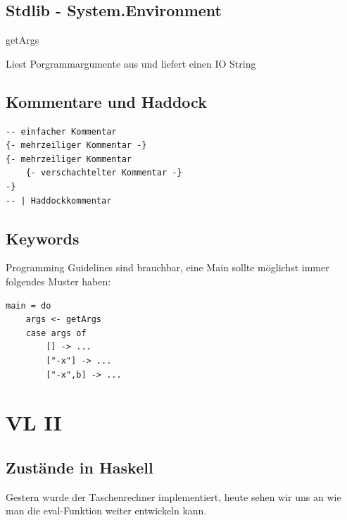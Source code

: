 \documentclass[ngerman,a4paper]{report}
\begin{document}
\section{Stdlib - System.Environment}
\begin{compactitem}
	\item getArgs
	\begin{compactitem}
		\item Liest Porgrammargumente aus und liefert einen IO String
	\end{compactitem}
\end{compactitem}

\section{Kommentare und Haddock}
\begin{lstlisting}
-- einfacher Kommentar
{- mehrzeiliger Kommentar -}
{- mehrzeiliger Kommentar 
	{- verschachtelter Kommentar -} 
-}
-- | Haddockkommentar
\end{lstlisting}

\section{Keywords}
Programming Guidelines sind brauchbar, eine Main sollte möglichst immer folgendes Muster haben:
\begin{lstlisting}
main = do 
	args <- getArgs
	case args of
		[] -> ...
		["-x"] -> ...
		["-x",b] -> ...
\end{lstlisting}

\chapter{VL II}
\section{Zustände in Haskell}
Gestern wurde der Taschenrechner implementiert, heute sehen wir uns an wie man die eval-Funktion weiter entwickeln kann.
\end{document}
